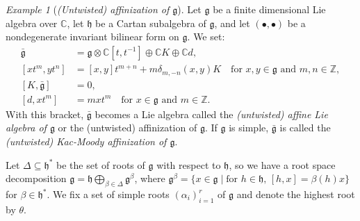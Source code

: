 \documentclass[a4paper, 12pt, reqno]{amsart}
\theoremstyle{remark}
\newtheorem{example}[theorem]{Example}
\begin{document}
\begin{example}[\emph{(Untwisted) affinization of $\mathfrak{g}$}]
  \label{exa:3}
  Let $\mathfrak{g}$ be a finite dimensional Lie algebra over $\mathbb{C}$, let $\mathfrak{h}$ be a Cartan subalgebra of $\mathfrak{g}$, and let $(\bullet, \bullet)$ be a nondegenerate invariant bilinear form on $\mathfrak{g}$.
  We set:
  \begin{align*}
    \bar{\mathfrak{g}} &= \mathfrak{g} \otimes \mathbb{C}[t, t^{-1}] \oplus \mathbb{C}K \oplus \mathbb{C}d, \\
    [xt^m, yt^n] &= [x, y]t^{m + n} + m\delta_{m, -n}(x, y)K \quad \text{for $x, y \in \mathfrak{g}$ and $m, n \in \mathbb{Z}$}, \\
    [K, \bar{\mathfrak{g}}] &= 0, \\
    [d, xt^m] &= mxt^m \quad \text{for $x \in \mathfrak{g}$ and $m \in \mathbb{Z}$}.
  \end{align*}
  With this bracket, $\bar{\mathfrak{g}}$ becomes a Lie algebra called the \emph{(untwisted) affine Lie algebra of $\mathfrak{g}$} or the (untwisted) affinization of $\mathfrak{g}$.
  If $\mathfrak{g}$ is simple, $\bar{\mathfrak{g}}$ is called the \emph{(untwisted) Kac-Moody affinization of $\mathfrak{g}$}.

  Let $\Delta \subseteq \mathfrak{h}^*$ be the set of roots of $\mathfrak{g}$ with respect to $\mathfrak{h}$, so we have a root space decomposition $\mathfrak{g} = \mathfrak{h} \bigoplus_{\beta \in \Delta}\mathfrak{g}^{\beta}$, where $\mathfrak{g}^{\beta} = \{x \in \mathfrak{g} \mid \text{for $h \in \mathfrak{h}$, $[h, x] = \beta(h)x$}\}$ for $\beta \in \mathfrak{h}^*$.
  We fix a set of simple roots $(\alpha_i)_{i = 1}^r$ of $\mathfrak{g}$ and denote the highest root by $\theta$.


\end{example}
\end{document}
